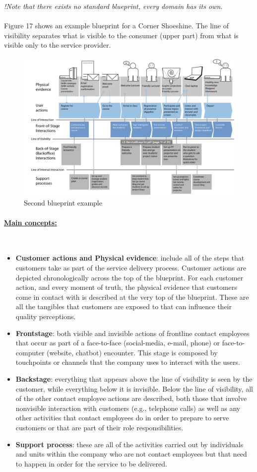 \documentclass[10pt,a4paper]{article}
\newcommand{\myparagraph}[1]{\paragraph{\uline{#1}}\mbox{}\\[0.05in]}
\begin{document}
\textit{!Note that there exists no standard blueprint, every domain has its own.} 
\\ \\
Figure 17 shows an example blueprint for a Corner Shoeshine. The line of visibility separates what is visible to the consumer (upper part) from what is visible only to the service provider.
\begin{figure}[ht!]
 \hfill \includegraphics[width=400pt]{images/second-service-blueprint}\hspace*{\fill}
 \caption{Second blueprint example}
  \label{fig:second-blueprint}
\end{figure}
\myparagraph{Main concepts:}
\begin{itemize}
	\item \textbf{Customer actions and Physical evidence}: include all of the steps that customers take as part of the service delivery process. Customer actions are depicted chronologically across the top of the blueprint. For each customer action, and every moment of truth, the physical evidence that customers come in contact with is described at the very top of the blueprint. These are all the tangibles that customers are exposed to that can influence their quality perceptions.
	\item \textbf{Frontstage}: both visible and invisible actions of frontline contact employees that occur as part of a face-to-face (social-media, e-mail, phone) or face-to-computer (website, chatbot) encounter. This stage is composed by touchpoints or channels that the company uses to interact with the users.
	\item \textbf{Backstage}: everything that appears above the line of visibility is seen by the customer, while everything below it is invisible. Below the line of visibility, all of the other contact employee actions are described, both those that involve nonvisible interaction with customers (e.g., telephone calls) as well as any other activities that contact employees do in order to prepare to serve customers or that are part of their role responsibilities.
	\item \textbf{Support process}: these are all of the activities carried out by individuals and units within the company who are not contact employees but that need to happen in order for the service to be delivered.
\end{itemize}
\end{document}
